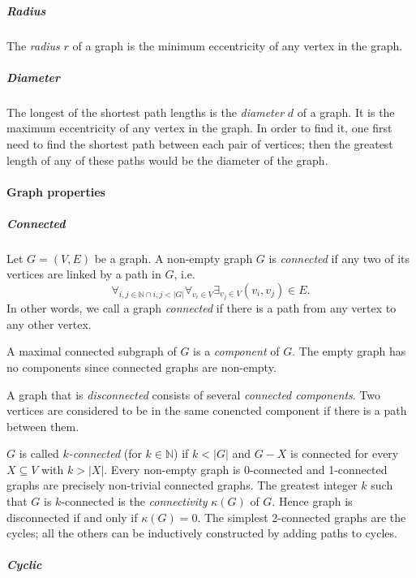         \subparagraph{Radius}

          The \emph{radius} $r$ of a graph is the minimum eccentricity of any vertex in the graph.

        \subparagraph{Diameter}
        
          The longest of the shortest path lengths is the \emph{diameter} $d$ of a graph. It is the maximum eccentricity of any vertex in the graph. In order to find it, one first need to find the shortest path between each pair of vertices; then the greatest length of any of these paths would be the diameter of the graph.

      \paragraph{Graph properties}

        \subparagraph{Connected}

          Let $G = (V, E)$ be a graph. A non-empty graph $G$ is \emph{connected} if any two of its vertices are linked by a path in $G$, i.e. 
          \begin{equation}
            \forall_{i,j \in \mathbb{N} \cap i,j < |G|} \forall_{v_i \in V} \exists_{v_j \in V} (v_i, v_j) \in E\mbox{.}
          \end{equation}
          In other words, we call a graph \emph{connected} if there is a path from any vertex to any other vertex.

          A maximal connected subgraph of $G$ is a \emph{component} of $G$. The empty graph has no components since connected graphs are non-empty. 

          A graph that is \emph{disconnected} consists of several \emph{connected components}. Two vertices are considered to be in the same conencted component if there is a path between them.

          $G$ is called $k$\emph{-connected} (for $k \in \mathbb{N}$) if $k < |G|$ and $G - X$ is connected for every $X \subseteq V$ with $k > |X|$. Every non-empty graph is 0-connected and 1-connected graphs are precisely non-trivial connected graphs. The greatest integer $k$ such that $G$ is $k$-connected is the \emph{connectivity} $\kappa(G)$ of $G$. Hence graph is disconnected if and only if $\kappa(G) = 0$. The simplest 2-connected graphs are the cycles; all the others can be inductively constructed by adding paths to cycles.

        \subparagraph{Cyclic}
        
